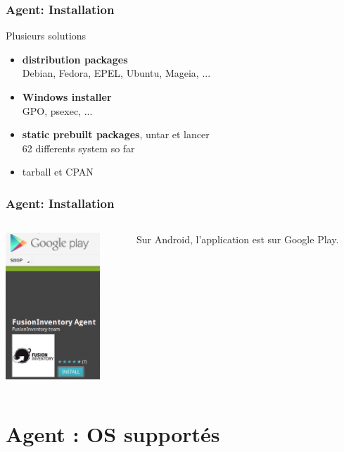 \documentclass{beamer}
\begin{document}
\begin{frame}
    \frametitle{Agent: Installation}


    \begin{block}{Plusieurs solutions}
        \begin{itemize}
            \item \textbf{distribution packages} \\
            \small{Debian, Fedora, EPEL, Ubuntu, Mageia, ...}
            \item \textbf{Windows installer} \\
            \small{GPO, psexec, ...}
            \item \textbf{static prebuilt packages}, untar et lancer \\
            \small{62 differents system so far}
            \item tarball et CPAN
        \end{itemize}
    \end{block}
\end{frame}

\begin{frame}
    \frametitle{Agent: Installation}

   \begin{columns}
   \begin{column}{0.35\textwidth}
\includegraphics[height=5.5cm]{pics/googleplay.png}
 \end{column}
 \begin{column}{0.65\textwidth}
Sur Android, l'application est sur Google Play.
 \end{column}
\end{columns}

\end{frame}


\section{Agent : OS supportés}
\end{document}
